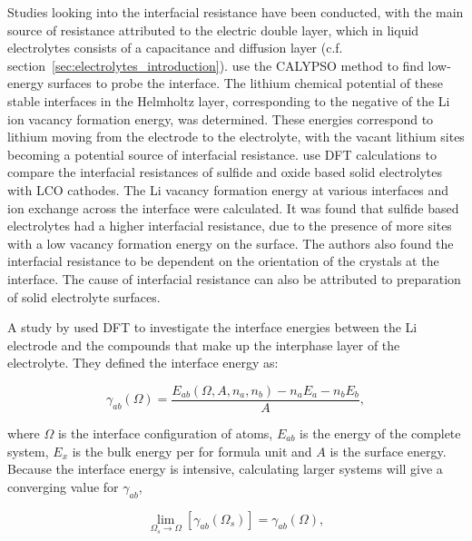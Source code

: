 \documentclass[../main.tex]{subfiles}
\begin{document}
Studies looking into the interfacial resistance have been conducted,\cite{Tateyama2019, Okuno2020, Sharafi2017, Jiang2019} with the main source of resistance attributed to the electric double layer, which in liquid electrolytes consists of a capacitance and diffusion layer (c.f. section~\ref{sec:electrolytes_introduction}).\cite{Tateyama2019} %
\citeauthor{Tateyama2019} use the CALYPSO method to find low-energy surfaces\cite{Gao2019} to probe the interface. The lithium chemical potential of these stable interfaces in the Helmholtz layer, corresponding to the negative of the Li ion vacancy formation energy, was determined. These energies correspond to lithium moving from the electrode to the electrolyte, with the vacant lithium sites becoming a potential source of interfacial resistance. \citeauthor{Okuno2020} use DFT calculations to compare the interfacial resistances of sulfide and oxide based solid electrolytes with LCO cathodes.\cite{Okuno2020} The Li vacancy formation energy at various interfaces and ion exchange across the interface were calculated. It was found that sulfide based electrolytes had a higher interfacial resistance, due to the presence of more sites with a low vacancy formation energy on the surface. The authors also found the interfacial resistance to be dependent on the orientation of the crystals at the interface. The cause of interfacial resistance can also be attributed to preparation of solid electrolyte surfaces.

A study by \citeauthor{Lepley2015} used DFT to investigate the interface energies between the Li electrode and the compounds that make up the interphase layer of the electrolyte.\cite{Lepley2015} They defined the interface energy as:

\begin{equation}
    \gamma_{ab}(\Omega)=\frac{E_{ab}(\Omega,A,n_a,n_b)-n_aE_a-n_bE_b}{A},
\end{equation}

where $\Omega$ is the interface configuration of atoms, $E_{ab}$ is the energy of the complete system, $E_x$ is the bulk energy per for formula unit and $A$ is the surface energy. Because the interface energy is intensive, calculating larger systems will give a converging value for $\gamma_{ab}$,

\begin{equation}
    \lim_{\Omega_s \rightarrow \Omega} \left[\gamma_{ab}(\Omega_s)\right]=\gamma_{ab}(\Omega),
\end{equation}
\end{document}
